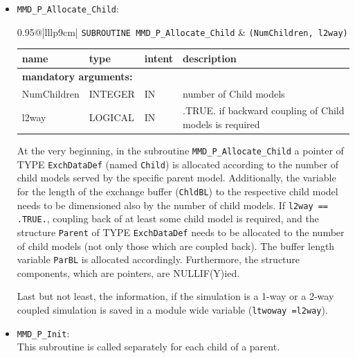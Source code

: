 \documentclass[twoside]{article}
\begin{document}
\begin{itemize}
\item \verb|MMD_P_Allocate_Child|:\\
\vspace*{-0.3cm}

\begin{tabular*}{0.95\textwidth}{@{\extracolsep\fill}|lllp{9cm}|}
\hline
{}
{\tt SUBROUTINE MMD\_P\_Allocate\_Child} &
{\tt (NumChildren, l2way)}\\
\hline
\end{tabular*}
\begin{tabular*}{0.95\textwidth}{@{\extracolsep\fill}|lllp{9cm}|}
name & type & intent & description\\
\hline
\multicolumn{4}{|l|}{\bf mandatory arguments:}\\
NumChildren & {\footnotesize INTEGER} & IN & number of Child models \\
l2way & {\footnotesize LOGICAL} & IN & .TRUE. if backward coupling of Child
models is required \\
\hline
\end{tabular*}
\smallskip

At the very beginning, in the subroutine \verb|MMD_P_Allocate_Child| a 
pointer of {\footnotesize TYPE} 
\verb|ExchDataDef| (named \verb|Child|) is allocated according to the
number of child models served by the specific parent
model. Additionally, the variable 
for the length of the exchange buffer (\verb|ChldBL|) to the respective
child model needs to be dimensioned also by the number of child models.
If \verb|l2way == .TRUE.|, coupling back of at least some child model is
required, and the structure \verb|Parent| of {\footnotesize
TYPE} \verb|ExchDataDef| needs to be allocated to the number of
child models (not only those which are coupled back).
 The buffer length variable \verb|ParBL| is allocated accordingly. 
Furthermore, the structure components, which are pointers, are
NULLIF(Y)ied.

Last but not least, the information, if the simulation is a 1-way or a
2-way coupled simulation is saved in a module wide variable
(\verb|ltwoway =l2way|). 

\item  \verb|MMD_P_Init|:\\
 This subroutine is called separately for each child of a parent.


\end{itemize}
\end{document}
